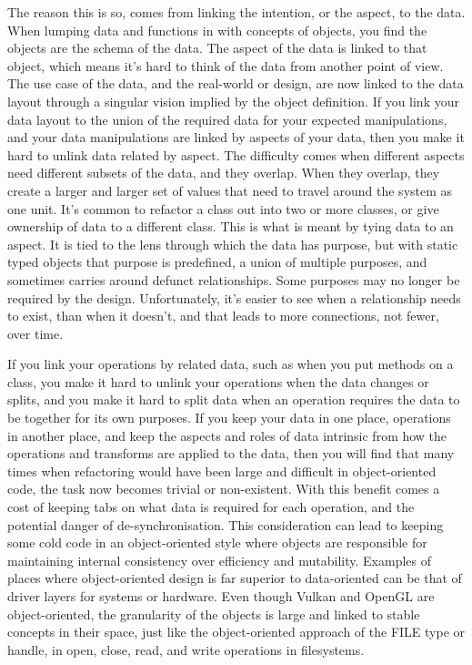 \documentclass[a4paper,12pt]{book}
\begin{document}
The reason this is so, comes from linking the intention, or the aspect, to the data.
When lumping data and functions in with concepts of objects, you find the objects are the schema of the data.
The aspect of the data is linked to that object, which means it's hard to think of the data from another point of view.
The use case of the data, and the real-world or design, are now linked to the data layout through a singular vision implied by the object definition.
If you link your data layout to the union of the required data for your expected manipulations, and your data manipulations are linked by aspects of your data, then you make it hard to unlink data related by aspect.
The difficulty comes when different aspects need different subsets of the data, and they overlap.
When they overlap, they create a larger and larger set of values that need to travel around the system as one unit.
It's common to refactor a class out into two or more classes, or give ownership of data to a different class.
This is what is meant by tying data to an aspect.
It is tied to the lens through which the data has purpose, but with static typed objects that purpose is predefined, a union of multiple purposes, and sometimes carries around defunct relationships.
Some purposes may no longer be required by the design.
Unfortunately, it's easier to see when a relationship needs to exist, than when it doesn't, and that leads to more connections, not fewer, over time.

If you link your operations by related data, such as when you put methods on a class, you make it hard to unlink your operations when the data changes or splits, and you make it hard to split data when an operation requires the data to be together for its own purposes.
If you keep your data in one place, operations in another place, and keep the aspects and roles of data intrinsic from how the operations and transforms are applied to the data, then you will find that many times when refactoring would have been large and difficult in object-oriented code, the task now becomes trivial or non-existent.
With this benefit comes a cost of keeping tabs on what data is required for each operation, and the potential danger of de-synchronisation.
This consideration can lead to keeping some cold code in an object-oriented style where objects are responsible for maintaining internal consistency over efficiency and mutability.
Examples of places where object-oriented design is far superior to data-oriented can be that of driver layers for systems or hardware.
Even though Vulkan and OpenGL are object-oriented, the granularity of the objects is large and linked to stable concepts in their space, just like the object-oriented approach of the FILE type or handle, in open, close, read, and write operations in filesystems.
\end{document}
